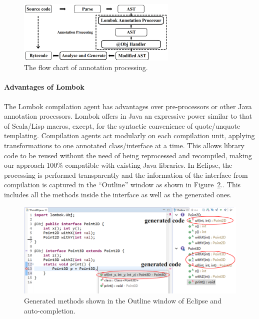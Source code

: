 
\begin{figure}[t]
\saveSpaceFig
\centering
\includegraphics[width=3in]{pdfs/lombok3.png}
\caption{The flow chart of \mixin annotation processing.
}
\label{fig:lombok}
\saveSpaceFig
\end{figure}


\paragraph{Advantages of Lombok}
The Lombok compilation agent has advantages over 
pre-processors or other Java annotation processors.
Lombok offers in Java an expressive power similar to that of Scala/Lisp macros,
except, for the syntactic convenience of quote/unquote templating. Compilation
agents act modularly on each compilation unit, applying transformations to one 
annotated class/interface at a time. This allows library code to be reused
without the need of being reprocessed and recompiled, making our
approach 100\% compatible with existing Java libraries. 
In Eclipse, the processing is 
performed transparently and the information of the interface from
compilation is captured in the ``Outline'' window as shown in Figure~\ref{fig:screenshot}..
This includes all the methods inside the interface as well as the generated ones.

\begin{figure}[t]
\saveSpaceFig
\saveSpaceFig
\centering
\includegraphics[width=4.5in]{pdfs/screenshot4.png}
\caption{Generated methods shown in the Outline window of Eclipse and auto-completion.}
\label{fig:screenshot}
\saveSpaceFig
\end{figure}

